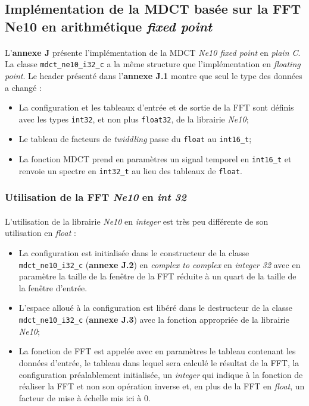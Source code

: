 \documentclass{article}
\begin{document}
    \subsection{Implémentation de la MDCT basée sur la FFT Ne10 en arithmétique \emph{fixed point}}
    \label{sec:ne10_mdct_i32_c}
    \paragraph{}
    L'\textbf{annexe J} présente l'implémentation de la MDCT \emph{Ne10 fixed point} en \emph{plain C}. La classe \texttt{mdct\_ne10\_i32\_c} a la même structure que l'implémentation en \emph{floating point}. Le header présenté dans l'\textbf{annexe J.1} montre que seul le type des données a changé :
    \begin{itemize}
        \item La configuration et les tableaux d'entrée et de sortie de la FFT sont définis avec les types \texttt{int32}, et non plus \texttt{float32}, de la librairie \emph{Ne10};
        \item Le tableau de facteurs de \emph{twiddling} passe du \texttt{float} au \texttt{int16\_t};
        \item La fonction MDCT prend en paramètres un signal temporel en \texttt{int16\_t} et renvoie un spectre en \texttt{int32\_t} au lieu des tableaux de \texttt{float}.
    \end{itemize}

    \subsubsection{Utilisation de la FFT \emph{Ne10} en \emph{int 32}}
    \paragraph{}
    L'utilisation de la librairie \emph{Ne10} en \emph{integer} est très peu différente de son utilisation en \emph{float} :
    \begin{itemize}
        \item La configuration est initialisée dans le constructeur de la classe \texttt{mdct\_ne10\_i32\_c} (\textbf{annexe J.2}) en \emph{complex to complex} en \emph{integer 32} avec en paramètre la taille de la fenêtre de la FFT réduite à un quart de la taille de la fenêtre d'entrée.
        \item L'espace alloué à la configuration est libéré dans le destructeur de la classe \texttt{mdct\_ne10\_i32\_c} (\textbf{annexe J.3}) avec la fonction appropriée de la librairie \emph{Ne10};
        \item La fonction de FFT est appelée avec en paramètres le tableau contenant les données d'entrée, le tableau dans lequel sera calculé le résultat de la FFT, la configuration préalablement initialisée, un \emph{integer} qui indique à la fonction de réaliser la FFT et non son opération inverse et, en plus de la FFT en \emph{float}, un facteur de mise à échelle mis ici à $0$.
    \end{itemize}
\end{document}
